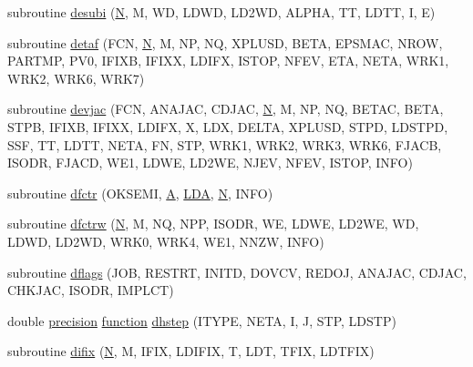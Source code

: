\begin{DoxyCompactItemize}
\item 
subroutine \hyperlink{d__odr_8f_a1f0ea3bc3d08f38b7a017d86874315d0}{desubi} (\hyperlink{polmisc_8c_a0240ac851181b84ac374872dc5434ee4}{N}, M, W\+D, L\+D\+W\+D, L\+D2\+W\+D, A\+L\+P\+H\+A, T\+T, L\+D\+T\+T, I, E)
\item 
subroutine \hyperlink{d__odr_8f_a65496afb97f97c3fa4e31eb23e38f919}{detaf} (F\+C\+N, \hyperlink{polmisc_8c_a0240ac851181b84ac374872dc5434ee4}{N}, M, N\+P, N\+Q, X\+P\+L\+U\+S\+D, B\+E\+T\+A, E\+P\+S\+M\+A\+C, N\+R\+O\+W, P\+A\+R\+T\+M\+P, P\+V0, I\+F\+I\+X\+B, I\+F\+I\+X\+X, L\+D\+I\+F\+X, I\+S\+T\+O\+P, N\+F\+E\+V, E\+T\+A, N\+E\+T\+A, W\+R\+K1, W\+R\+K2, W\+R\+K6, W\+R\+K7)
\item 
subroutine \hyperlink{d__odr_8f_a52615e4a5f1c2e549f2bbf337fd052b3}{devjac} (F\+C\+N, A\+N\+A\+J\+A\+C, C\+D\+J\+A\+C, \hyperlink{polmisc_8c_a0240ac851181b84ac374872dc5434ee4}{N}, M, N\+P, N\+Q, B\+E\+T\+A\+C, B\+E\+T\+A, S\+T\+P\+B, I\+F\+I\+X\+B, I\+F\+I\+X\+X, L\+D\+I\+F\+X, X, L\+D\+X, D\+E\+L\+T\+A, X\+P\+L\+U\+S\+D, S\+T\+P\+D, L\+D\+S\+T\+P\+D, S\+S\+F, T\+T, L\+D\+T\+T, N\+E\+T\+A, F\+N, S\+T\+P, W\+R\+K1, W\+R\+K2, W\+R\+K3, W\+R\+K6, F\+J\+A\+C\+B, I\+S\+O\+D\+R, F\+J\+A\+C\+D, W\+E1, L\+D\+W\+E, L\+D2\+W\+E, N\+J\+E\+V, N\+F\+E\+V, I\+S\+T\+O\+P, I\+N\+F\+O)
\item 
subroutine \hyperlink{d__odr_8f_ad807c38996d943e318dd314b9fbcaacb}{dfctr} (O\+K\+S\+E\+M\+I, \hyperlink{classA}{A}, \hyperlink{example__user_8c_ae946da542ce0db94dced19b2ecefd1aa}{L\+D\+A}, \hyperlink{polmisc_8c_a0240ac851181b84ac374872dc5434ee4}{N}, I\+N\+F\+O)
\item 
subroutine \hyperlink{d__odr_8f_ade847617a12993f58803a3aeb83417b9}{dfctrw} (\hyperlink{polmisc_8c_a0240ac851181b84ac374872dc5434ee4}{N}, M, N\+Q, N\+P\+P, I\+S\+O\+D\+R, W\+E, L\+D\+W\+E, L\+D2\+W\+E, W\+D, L\+D\+W\+D, L\+D2\+W\+D, W\+R\+K0, W\+R\+K4, W\+E1, N\+N\+Z\+W, I\+N\+F\+O)
\item 
subroutine \hyperlink{d__odr_8f_aae4ac2951cd8e2fde66b0c8393037ec8}{dflags} (J\+O\+B, R\+E\+S\+T\+R\+T, I\+N\+I\+T\+D, D\+O\+V\+C\+V, R\+E\+D\+O\+J, A\+N\+A\+J\+A\+C, C\+D\+J\+A\+C, C\+H\+K\+J\+A\+C, I\+S\+O\+D\+R, I\+M\+P\+L\+C\+T)
\item 
double \hyperlink{numinquire_8h_a2c8e616467665d0b2814d4c1589ba74e}{precision} \hyperlink{afunc_8m_a7b5e596df91eadea6c537c0825e894a7}{function} \hyperlink{d__odr_8f_a93d9b7ec49a24cfbd0c47cc0fb06f6a4}{dhstep} (I\+T\+Y\+P\+E, N\+E\+T\+A, I, J, S\+T\+P, L\+D\+S\+T\+P)
\item 
subroutine \hyperlink{d__odr_8f_ad26b3cbeb9bae49819353237f97eb8a6}{difix} (\hyperlink{polmisc_8c_a0240ac851181b84ac374872dc5434ee4}{N}, M, I\+F\+I\+X, L\+D\+I\+F\+I\+X, T, L\+D\+T, T\+F\+I\+X, L\+D\+T\+F\+I\+X)

\end{DoxyCompactItemize}
